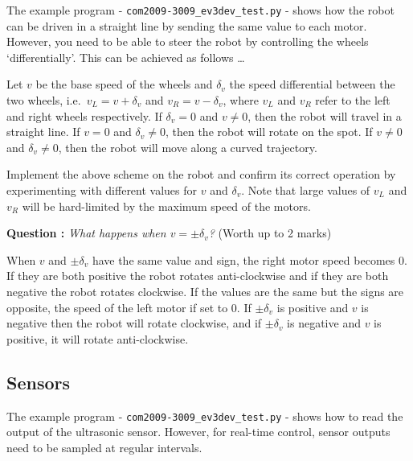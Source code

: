 \documentclass[hidelinks,a4paper,11pt]{article}
\newcounter{question}
\newcommand\myq{\refstepcounter{question}\thequestion}
\begin{document}
	The example program - \texttt{com2009-3009\_ev3dev\_test.py} - shows how the robot can be driven in a straight line by sending the same value to each motor.  However, you need to be able to steer the robot by controlling the wheels `differentially'.  This can be achieved as follows \ldots
	
	Let $v$ be the base speed of the wheels and $\delta_{v}$ the speed differential between the two wheels, i.e.\ $v_{L} = v + \delta_{v}$ and $v_{R} = v - \delta_{v}$, where  $v_{L}$ and  $v_{R}$ refer to the left and right wheels respectively.  If $\delta_{v} =0$ and $v\neq0$, then the robot will travel in a straight line.  If $v=0$ and $\delta_{v}\neq0$, then the robot will rotate on the spot.  If $v\neq0$ and $\delta_{v}\neq0$, then the robot will move along a curved trajectory.
	
	\begin{todolist}
		\item Implement the above scheme on the robot and confirm its correct operation by experimenting with different values for $v$ and $\delta_{v}$.    Note that large values of $v_{L}$ and $v_{R}$ will be hard-limited by the maximum speed of the motors.
	\end{todolist}
	
	{\bfseries Question \myq:}  \emph{What happens when $v=\pm\delta_{v}$?} (Worth up to 2 marks)\\
	\begin{mdframed}
		When $v$ and  $\pm\delta_{v}$ have the same value and sign, the right motor speed becomes 0.  If they are both positive the robot rotates anti-clockwise and if they are both negative the robot rotates clockwise.  If the values are the same but the signs are opposite, the speed of the left motor if set to 0.  If $\pm\delta_{v}$ is positive and $v$ is negative then the robot will rotate clockwise, and if $\pm\delta_{v}$  is negative and $v$ is positive, it will rotate anti-clockwise.
	\end{mdframed}
	\vspace*{\baselineskip}
	
	
	\subsection{Sensors}
	
	The example program - \texttt{com2009-3009\_ev3dev\_test.py} - shows how to read the output of the ultrasonic sensor.  However, for real-time control, sensor outputs need to be sampled at regular intervals.
	
\end{document}
